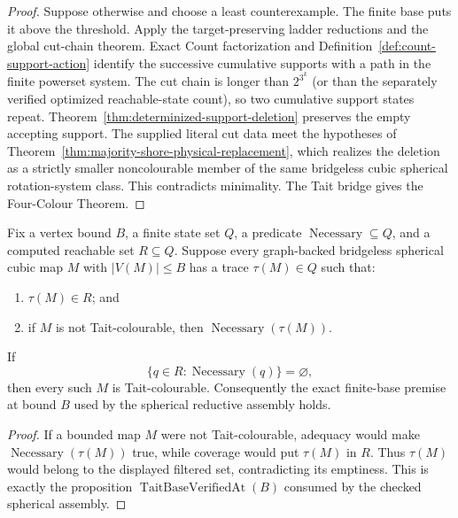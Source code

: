 \begin{proof}
Suppose otherwise and choose a least counterexample.  The finite base puts it
above the threshold.  Apply the target-preserving ladder reductions and the
global cut-chain theorem.  Exact Count factorization and
Definition~\ref{def:count-support-action} identify the successive cumulative
supports with a path in the finite powerset system.  The cut chain is longer
than \(2^{3^k}\) (or than the separately verified optimized reachable-state
count), so two cumulative support states repeat.
Theorem~\ref{thm:determinized-support-deletion} preserves the
empty accepting support.  The supplied literal cut data meet the hypotheses
of Theorem~\ref{thm:majority-shore-physical-replacement}, which realizes the
deletion as a strictly smaller noncolourable member of the same bridgeless
cubic spherical rotation-system class.  This
contradicts minimality.  The Tait bridge gives the Four-Colour Theorem.
\end{proof}

\begin{theorem}
\label{thm:route-native-finite-base-reflection}
Fix a vertex bound \(B\), a finite state set \(Q\), a predicate
\(\operatorname{Necessary}\subseteq Q\), and a computed reachable set
\(R\subseteq Q\).  Suppose every graph-backed bridgeless spherical cubic map
\(M\) with \(|V(M)|\leq B\) has a trace \(\tau(M)\in Q\) such that:
\begin{enumerate}
\item \(\tau(M)\in R\); and
\item if \(M\) is not Tait-colourable, then
      \(\operatorname{Necessary}(\tau(M))\).
\end{enumerate}
If
\[
             \{q\in R:\operatorname{Necessary}(q)\}=\varnothing,
\]
then every such \(M\) is Tait-colourable.  Consequently the exact
finite-base premise at bound \(B\) used by the spherical reductive assembly
holds.
\end{theorem}

\begin{proof}
If a bounded map \(M\) were not Tait-colourable, adequacy would make
\(\operatorname{Necessary}(\tau(M))\) true, while coverage would put
\(\tau(M)\) in \(R\).  Thus \(\tau(M)\) would belong to the displayed
filtered set, contradicting its emptiness.  This is exactly the proposition
\(\operatorname{TaitBaseVerifiedAt}(B)\) consumed by the checked spherical
assembly.
\end{proof}

